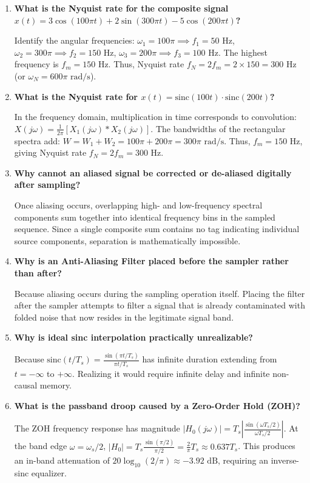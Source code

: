 \documentclass[12pt,a4paper]{article}
\newcommand{\Q}[1]{\textbf{#1}\par\noindent\ignorespaces}
\begin{document}
\begin{tcolorbox}[exambox, title={\textbf{Frequently Asked / Viva Questions}}]
\begin{enumerate}[topsep=0pt, label=\textbf{Q\arabic*.}, itemsep=5pt]
  \item \Q{What is the Nyquist rate for the composite signal $x(t) = 3\cos(100\pi t) + 2\sin(300\pi t) - 5\cos(200\pi t)$?}
  Identify the angular frequencies: $\omega_1 = 100\pi \implies f_1 = 50\text{ Hz}$, $\omega_2 = 300\pi \implies f_2 = 150\text{ Hz}$, $\omega_3 = 200\pi \implies f_3 = 100\text{ Hz}$. The highest frequency is $f_m = 150\text{ Hz}$. Thus, Nyquist rate $f_N = 2 f_m = 2 \times 150 = 300\text{ Hz}$ (or $\omega_N = 600\pi\text{ rad/s}$).

  \item \Q{What is the Nyquist rate for $x(t) = \text{sinc}(100 t) \cdot \text{sinc}(200 t)$?}
  In the frequency domain, multiplication in time corresponds to convolution: $X(j\omega) = \frac{1}{2\pi} [X_1(j\omega) * X_2(j\omega)]$. The bandwidths of the rectangular spectra add: $W = W_1 + W_2 = 100\pi + 200\pi = 300\pi\text{ rad/s}$. Thus, $f_m = 150\text{ Hz}$, giving Nyquist rate $f_N = 2 f_m = 300\text{ Hz}$.

  \item \Q{Why cannot an aliased signal be corrected or de-aliased digitally after sampling?}
  Once aliasing occurs, overlapping high- and low-frequency spectral components sum together into identical frequency bins in the sampled sequence. Since a single composite sum contains no tag indicating individual source components, separation is mathematically impossible.

  \item \Q{Why is an Anti-Aliasing Filter placed before the sampler rather than after?}
  Because aliasing occurs during the sampling operation itself. Placing the filter after the sampler attempts to filter a signal that is already contaminated with folded noise that now resides in the legitimate signal band.

  \item \Q{Why is ideal sinc interpolation practically unrealizable?}
  Because $\text{sinc}(t/T_s) = \frac{\sin(\pi t / T_s)}{\pi t / T_s}$ has infinite duration extending from $t = -\infty$ to $+\infty$. Realizing it would require infinite delay and infinite non-causal memory.

  \item \Q{What is the passband droop caused by a Zero-Order Hold (ZOH)?}
  The ZOH frequency response has magnitude $|H_0(j\omega)| = T_s \left|\frac{\sin(\omega T_s / 2)}{\omega T_s / 2}\right|$. At the band edge $\omega = \omega_s / 2$, $|H_0| = T_s \frac{\sin(\pi/2)}{\pi/2} = \frac{2}{\pi} T_s \approx 0.637 T_s$. This produces an in-band attenuation of $20\log_{10}(2/\pi) \approx -3.92\text{ dB}$, requiring an inverse-sinc equalizer.


\end{enumerate}
\end{tcolorbox}
\end{document}
